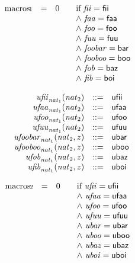 $$
\begin{array}{@{}lcl@{}l@{}}
{\mathrm{macros{\kern-0.1em\scriptstyle 1}}} &=& 0
  &\qquad \mbox{if}~{\mathit{fii}} = \mathsf{fii} \\
  &&&\qquad {\land}~{\mathit{faa}} = \mathsf{faa} \\
  &&&\qquad {\land}~{\mathit{foo}} = \mathsf{foo} \\
  &&&\qquad {\land}~{\mathit{fuu}} = \mathsf{fuu} \\
  &&&\qquad {\land}~{\mathit{foobar}} = \mathsf{bar} \\
  &&&\qquad {\land}~{\mathit{fooboo}} = \mathsf{boo} \\
  &&&\qquad {\land}~{\mathit{fob}} = \mathsf{baz} \\
  &&&\qquad {\land}~{\mathit{fib}} = \mathsf{boi} \\
\end{array}
$$

$$
\begin{array}{@{}lrrl@{}l@{}}
& {{\mathit{ufii}}}_{{\mathit{nat}}_1}({\mathit{nat}}_2) &::=& \mathsf{ufii} \\
& {{\mathit{ufaa}}}_{{\mathit{nat}}_1}({\mathit{nat}}_2) &::=& \mathsf{ufaa} \\
& {{\mathit{ufoo}}}_{{\mathit{nat}}_1}({\mathit{nat}}_2) &::=& \mathsf{ufoo} \\
& {{\mathit{ufuu}}}_{{\mathit{nat}}_1}({\mathit{nat}}_2) &::=& \mathsf{ufuu} \\
& {{\mathit{ufoobar}}}_{{\mathit{nat}}_1}({\mathit{nat}}_2, z) &::=& \mathsf{ubar} \\
& {{\mathit{ufooboo}}}_{{\mathit{nat}}_1}({\mathit{nat}}_2, z) &::=& \mathsf{uboo} \\
& {{\mathit{ufob}}}_{{\mathit{nat}}_1}({\mathit{nat}}_2, z) &::=& \mathsf{ubaz} \\
& {{\mathit{ufib}}}_{{\mathit{nat}}_1}({\mathit{nat}}_2, z) &::=& \mathsf{uboi} \\
\end{array}
$$

$$
\begin{array}{@{}lcl@{}l@{}}
{\mathrm{macros{\kern-0.1em\scriptstyle 2}}} &=& 0
  &\qquad \mbox{if}~{\mathit{ufii}} = \mathsf{ufii} \\
  &&&\qquad {\land}~{\mathit{ufaa}} = \mathsf{ufaa} \\
  &&&\qquad {\land}~{\mathit{ufoo}} = \mathsf{ufoo} \\
  &&&\qquad {\land}~{\mathit{ufuu}} = \mathsf{ufuu} \\
  &&&\qquad {\land}~{\mathit{ubar}} = \mathsf{ubar} \\
  &&&\qquad {\land}~{\mathit{uboo}} = \mathsf{uboo} \\
  &&&\qquad {\land}~{\mathit{ubaz}} = \mathsf{ubaz} \\
  &&&\qquad {\land}~{\mathit{uboi}} = \mathsf{uboi} \\
\end{array}
$$


